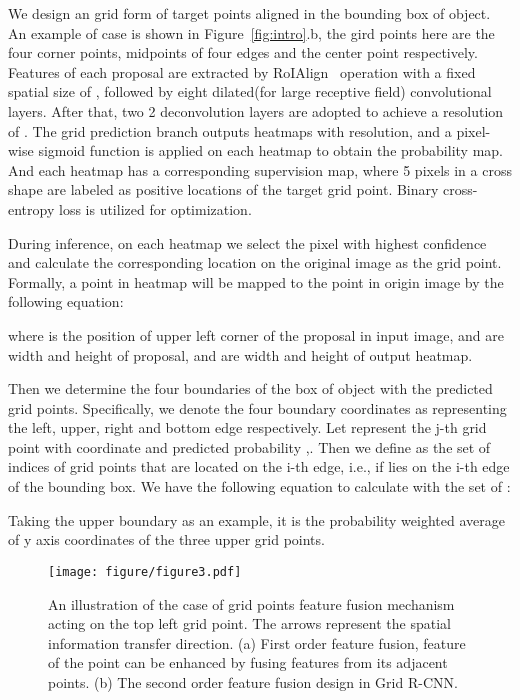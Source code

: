 \documentclass[10pt,twocolumn,letterpaper]{article}
\begin{document}
We design an  grid form of target points aligned in the bounding box of object. An example of  case is shown in Figure~\ref{fig:intro}.b, the gird points here are the four corner points, midpoints of four edges and the center point respectively. Features of each proposal are extracted by RoIAlign~\cite{he2017mask} operation with a fixed spatial size of , followed by eight  dilated(for large receptive field) convolutional layers. After that, two 2 deconvolution layers are adopted to achieve a resolution of .
The grid prediction branch outputs  heatmaps with  resolution, and a pixel-wise sigmoid function is applied on each heatmap to obtain the probability map. And each heatmap has a corresponding supervision map, where 5 pixels in a cross shape are labeled as positive locations of the target grid point. Binary cross-entropy loss is utilized for optimization.

During inference, on each heatmap we select the pixel with highest confidence and calculate the corresponding location on the original image as the grid point. Formally, a point  in heatmap will be mapped to the point  in origin image by the following equation:

where  is the position of upper left corner of the proposal in input image,  and  are width and height of proposal,  and  are width and height of output heatmap. 

Then we determine the four boundaries of the box of object with the predicted grid points. Specifically, we denote the four boundary coordinates as  representing the left, upper, right and bottom edge respectively. Let  represent the j-th grid point with coordinate  and predicted probability ,. Then we define  as the set of indices of grid points that are located on the i-th edge, i.e.,  if  lies on the i-th edge of the bounding box.
We have the following equation to calculate  with the set of : 

Taking the upper boundary  as an example, it is the probability weighted average of y axis coordinates of the three upper grid points.

\begin{figure}[t]
\centering
\texttt{[image: figure/figure3.pdf]}
\caption{An illustration of the  case of grid points feature fusion mechanism acting on the top left grid point. The arrows represent the spatial information transfer direction. (a) First order feature fusion, feature of the point can be enhanced by fusing features from its adjacent points. (b) The second order feature fusion design in Grid R-CNN.}
\label{fig:fusion}
\end{figure}
\end{document}
